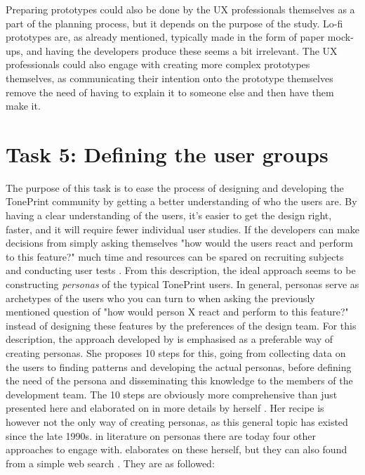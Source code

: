Preparing prototypes could also be done by the UX professionals themselves as a part of the planning process, but it depends on the purpose of the study. Lo-fi prototypes are, as already mentioned, typically made in the form of paper mock-ups, and having the developers produce these seems a bit irrelevant. The UX professionals could also engage with creating more complex prototypes themselves, as communicating their intention onto the prototype themselves remove the need of having to explain it to someone else and then have them make it.

\section{Task 5: Defining the user groups}
\label{Task5}
The purpose of this task is to ease the process of designing and developing the TonePrint community by getting a better understanding of who the users are. By having a clear understanding of the users, it's easier to get the design right, faster, and it will require fewer individual user studies. If the developers can make decisions from simply asking themselves "how would the users react and perform to this feature?" much time and resources can be spared on recruiting subjects and conducting user tests \parencite{WEB:PersonasIDF}. From this description, the ideal approach seems to be constructing \textit{personas} of the typical TonePrint users. In general, personas serve as archetypes of the users who you can turn to when asking the previously mentioned question of "how would person X react and perform to this feature?" instead of designing these features by the preferences of the design team. For this description, the approach developed by \textcite{WEB:PersonaKilde} is emphasised as a preferable way of creating personas. She proposes 10 steps for this, going from collecting data on the users to finding patterns and developing the actual personas, before defining the need of the persona and disseminating this knowledge to the members of the development team. The 10 steps are obviously more comprehensive than just presented here and elaborated on in more details by \citeauthor{WEB:PersonaKilde} herself \parencite[][9]{WEB:PersonaKilde}. Her recipe is however not the only way of creating personas, as this general topic has existed since the late 1990s. in literature on personas there are today four other approaches to engage with. \citeauthor{WEB:PersonaKilde} elaborates on these herself, but they can also found from a simple web search \parencite{WEB:PersonasIDF}. They are as followed:
